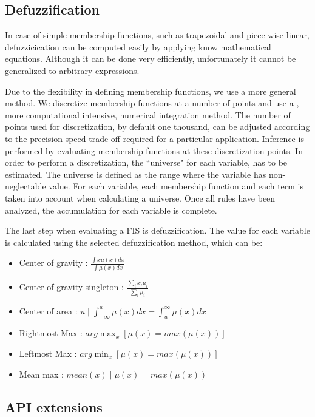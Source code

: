 \documentclass[11pt,twoside]{article}
\begin{document}
\begin{multicols}{2}
\subsection{Defuzzification\label{sec:defuzz}}

In case of simple membership functions, such as trapezoidal and piece-wise linear, defuzzicication can be computed easily by applying know mathematical equations.
Although it can be done very efficiently, unfortunately it cannot be generalized to arbitrary expressions.

Due to the flexibility in defining membership functions, we use a more general method.
We discretize membership functions at a number of points and use a , more computational intensive, numerical integration method.
The number of points used for discretization, by default one thousand, can be adjusted according to the precision-speed trade-off required for a particular application.
Inference is performed by evaluating membership functions at these discretization points.
In order to perform a discretization, the ``universe" for each variable, has to be estimated. 
The universe is defined as the range where the variable has non-neglectable value. 
For each variable, each membership function and each term is taken into account when calculating a universe.
Once all rules have been analyzed, the accumulation for each variable is complete. 

The last step when evaluating a FIS is defuzzification.
The value for each variable is calculated using the selected defuzzification method, which can be:

\begin{itemize}
	\item Center of gravity : $\frac{\int{x \mu(x) dx}}{\int{\mu(x) dx}}$
	\item Center of gravity singleton : $\frac{\sum_{i}{x_i \mu_i}}{\sum_{i}{\mu_i}}$
	\item Center of area : $u \; | \; \int_{-\infty}^{u}{\mu(x) dx} = \int_{u}^{\infty}{\mu(x) dx}$
	\item Rightmost Max : $arg\max_{x}{[ \mu(x) = max(\mu(x)) ] }$
	\item Leftmost Max : $arg\min_{x}{[ \mu(x) = max(\mu(x)) ] }$
	\item Mean max : $mean(x) \; | \; \mu(x) = max(\mu(x)) $
\end{itemize}


\subsection{API extensions \label{sec:ext}}


\end{multicols}
\end{document}
